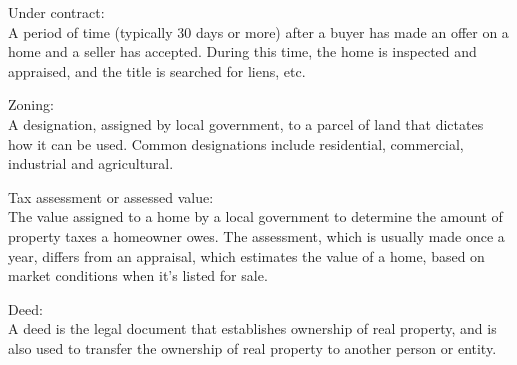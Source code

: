 \documentclass[12pt]{article}
\newcommand{\jargon}[1]{{\large\noindent\color{red} #1:}}
\begin{document}
\jargon{Under contract} \\
A period of time (typically 30 days or more) after a buyer has made an offer on a home and a seller has accepted. During this time, the home is inspected and appraised, and the title is searched for liens, etc.
\vspace{1em}

\jargon{Zoning} \\
A designation, assigned by local government, to a parcel of land that dictates how it can be used. Common designations include residential, commercial, industrial and agricultural.
\vspace{1em}

\jargon{Tax assessment or assessed value} \\
The value assigned to a home by a local government to determine the amount of property taxes a homeowner owes.  The assessment, which is usually made once a year, differs from an appraisal, which estimates the value of a home, based on market conditions when it’s listed for sale. 
\vspace{1em}

\jargon{Deed} \\
A deed is the legal document that establishes ownership of real property, and is also used to transfer the ownership of real property to another person or entity.
\end{document}
